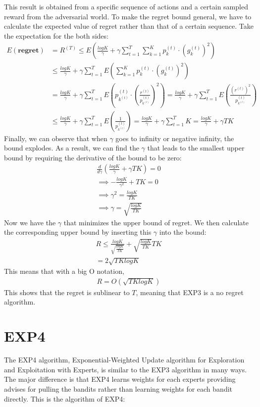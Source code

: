 \documentclass[11pt]{article}
\begin{document}
This result is obtained from a specific sequence of actions and a certain sampled reward from the adversarial world. To make the regret bound general, we have to calculate the expected value of regret rather than that of a certain sequence. Take the expectation for the both sides:
\begin{align*}
    E(\textbf{regret}) &= R^{(T)} \leq E( \frac{logK}{\gamma} + \gamma \sum_{t=1}^T \sum_{k=1}^K p_k^{(t)} \cdot (g_k^{(t)})^2 ) \\
    &\leq \frac{logK}{\gamma} + \gamma \sum_{t=1}^T E( \sum_{k=1}^K p_k^{(t)} \cdot (g_k^{(t)})^2 )\\
    &= \frac{logK}{\gamma} + \gamma \sum_{t=1}^T E(p_{k^{(t)}}^{(t)} \cdot (\frac{r^{(t)}}{p_{k^{(t)}}^{(t)}})^2 ) = \frac{logK}{\gamma} + \gamma \sum_{t=1}^T E(\frac{(r^{(t)})^2}{p_{k^{(t)}}^{(t)}})\\
    &\leq \frac{logK}{\gamma} + \gamma \sum_{t=1}^T E(\frac{1}{p_{k^{(t)}}^{(t)}}) = \frac{logK}{\gamma} + \gamma \sum_{t=1}^T K = \frac{logK}{\gamma} + \gamma T K
\end{align*}
Finally, we can observe that when $\gamma$ goes to infinity or negative infinity, the bound explodes. As a result, we can find the $\gamma$ that leads to the smallest upper bound by requiring the derivative of the bound to be zero:
\begin{align}
    \frac{d}{d\gamma}(\frac{logK}{\gamma} + \gamma T K) = 0\\
    \implies -\frac{logK}{\gamma^2} + T K = 0\\
    \implies \gamma^2 = \frac{logK}{TK}\\
    \implies \gamma = \sqrt{\frac{logK}{TK}}
\end{align}
Now we have the $\gamma$ that minimizes the upper bound of regret. We then calculate the corresponding upper bound by inserting this $\gamma$ into the bound:
\begin{align}
    R \leq \frac{logK}{\sqrt{\frac{logK}{TK}}} + \sqrt{\frac{logK}{TK}} TK\\
    = 2\sqrt{TKlogK}
\end{align}
This means that with a big O notation,
\begin{align}
    R = O(\sqrt{TKlogK})
\end{align}
This shows that the regret is sublinear to $T$, meaning that EXP3 is a no regret algorithm.
\section{EXP4}
The EXP4 algorithm, Exponential-Weighted Update algorithm for Exploration and Exploitation with Experts, is similar to the EXP3 algorithm in many ways. The major difference is that EXP4 learns weights for each experts providing advises for pulling the bandits rather than learning weights for each bandit directly. This is the algorithm of EXP4:
\end{document}
